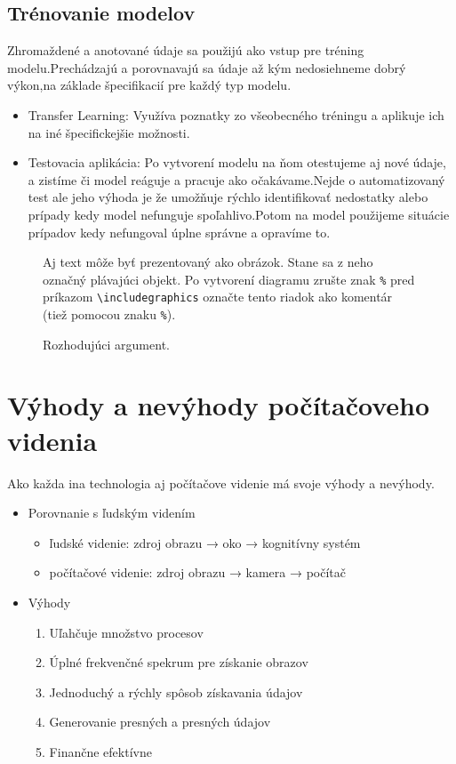 \documentclass[10pt,twoside,slovak,a4paper]{coursepaper}
\begin{document}
\subsection{Trénovanie modelov} \label{ina:nejako}
Zhromaždené a anotované údaje sa použijú ako vstup pre tréning modelu.Prechádzajú a porovnavajú sa údaje až kým nedosiehneme dobrý výkon,na základe špecifikacií pre každý typ modelu.

\begin{itemize}
\item Transfer Learning: Využíva poznatky zo všeobecného tréningu a aplikuje ich na iné špecifickejšie možnosti.
\item Testovacia aplikácia: Po vytvorení modelu na ňom otestujeme aj nové údaje, a zistíme či model reáguje a pracuje ako očakávame.Nejde o automatizovaný test ale jeho výhoda je že umožňuje rýchlo identifikovať nedostatky alebo prípady kedy model nefunguje spoľahlivo.Potom na model použijeme situácie prípadov kedy nefungoval úplne správne a opravíme to.
\end{itemize} 

\begin{figure*}[tbh]
\centering
Aj text môže byť prezentovaný ako obrázok. Stane sa z neho označný plávajúci objekt. Po vytvorení diagramu zrušte znak \texttt{\%} pred príkazom \verb|\includegraphics| označte tento riadok ako komentár (tiež pomocou znaku \texttt{\%}).
\caption{Rozhodujúci argument.}
\label{f:rozhod}
\end{figure*}



\section{Výhody a nevýhody počítačoveho videnia} \label{ina}
Ako každa ina technologia aj počítačove videnie má svoje výhody a nevýhody.
\begin{itemize}
\item Porovnanie s ľudským videním
	\begin{itemize}
	\item ľudské videnie: zdroj obrazu → oko → kognitívny systém
	\item počítačové videnie: zdroj obrazu → kamera → počítač
	\end{itemize}
\end{itemize}

\begin{itemize}
\item Výhody
	\begin{enumerate}
	\item Uľahčuje množstvo procesov
	\item Úplné frekvenčné spekrum pre získanie obrazov
	\item Jednoduchý a rýchly spôsob získavania údajov
	\item Generovanie presných a presných údajov
	\item Finančne efektívne
	\end{enumerate}
\end{itemize}
\end{document}
